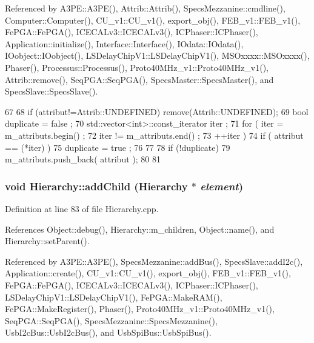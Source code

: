 Referenced by A3PE::A3PE(), Attrib::Attrib(), SpecsMezzanine::cmdline(), Computer::Computer(), CU\_\-v1::CU\_\-v1(), export\_\-obj(), FEB\_\-v1::FEB\_\-v1(), FePGA::FePGA(), ICECALv3::ICECALv3(), ICPhaser::ICPhaser(), Application::initialize(), Interface::Interface(), IOdata::IOdata(), IOobject::IOobject(), LSDelayChipV1::LSDelayChipV1(), MSOxxxx::MSOxxxx(), Phaser(), Processus::Processus(), Proto40MHz\_\-v1::Proto40MHz\_\-v1(), Attrib::remove(), SeqPGA::SeqPGA(), SpecsMaster::SpecsMaster(), and SpecsSlave::SpecsSlave().


\begin{DoxyCode}
67                             {
68     if (attribut!=Attrib::UNDEFINED) remove(Attrib::UNDEFINED);
69     bool duplicate = false ;
70     std::vector<int>::const_iterator iter ;
71     for ( iter  = m_attributs.begin() ;
72           iter != m_attributs.end()   ;
73           ++iter ) {
74       if ( attribut == (*iter) ) {
75         duplicate = true ;
76       }
77     }
78     if (!duplicate) {
79       m_attributs.push_back( attribut );
80     }
81   }
\end{DoxyCode}
\hypertarget{classHierarchy_ad677774ff38fcb257c04a3a10d471fac}{
\subsubsection[{addChild}]{\setlength{\rightskip}{0pt plus 5cm}void Hierarchy::addChild ({\bf Hierarchy} $\ast$ {\em element})}}
\label{classHierarchy_ad677774ff38fcb257c04a3a10d471fac}


Definition at line 83 of file Hierarchy.cpp.

References Object::debug(), Hierarchy::m\_\-children, Object::name(), and Hierarchy::setParent().

Referenced by A3PE::A3PE(), SpecsMezzanine::addBus(), SpecsSlave::addI2c(), Application::create(), CU\_\-v1::CU\_\-v1(), export\_\-obj(), FEB\_\-v1::FEB\_\-v1(), FePGA::FePGA(), ICECALv3::ICECALv3(), ICPhaser::ICPhaser(), LSDelayChipV1::LSDelayChipV1(), FePGA::MakeRAM(), FePGA::MakeRegister(), Phaser(), Proto40MHz\_\-v1::Proto40MHz\_\-v1(), SeqPGA::SeqPGA(), SpecsMezzanine::SpecsMezzanine(), UsbI2cBus::UsbI2cBus(), and UsbSpiBus::UsbSpiBus().


